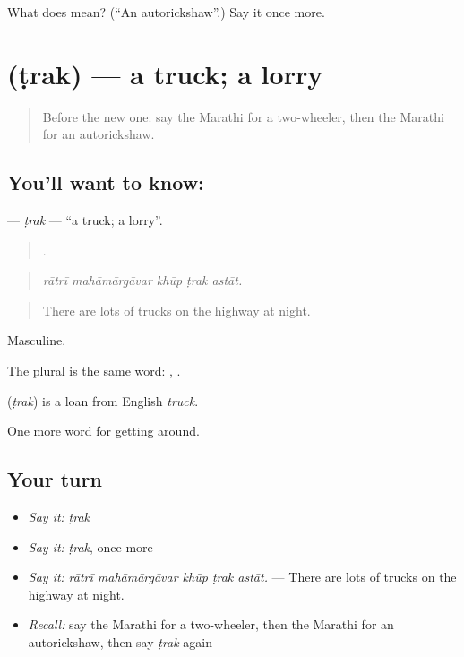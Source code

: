 \begin{tcolorbox}[breakable,colback=teal!4,colframe=teal!35!black,title={Before you move on}]
What does  mean? (\textquotedblleft{}An autorickshaw\textquotedblright{}.) Say it once more.
\end{tcolorbox}
\section[\texorpdfstring{\mr{ट्रक} (ṭrak)}{ट्रक (ṭrak)}]{ (ṭrak) — a truck; a lorry}

\label{lesson:MR-C400-trak}



\begin{quote}
Before the new one: say the Marathi for a two-wheeler, then the Marathi for an autorickshaw.
\end{quote}

\subsection*{You'll want to know: }
\textbf{} — \emph{ṭrak} — \textquotedblleft{}a truck; a lorry\textquotedblright{}.

\begin{quote}
    .
\end{quote}

\begin{quote}
\emph{rātrī mahāmārgāvar khūp ṭrak astāt.}
\end{quote}

\begin{quote}
There are lots of trucks on the highway at night.
\end{quote}

Masculine.

The plural is the same word:  ,  .

\begin{cousinweb}
\textbf{} (\emph{ṭrak}) is a loan from English \emph{truck}.
\end{cousinweb}

\begin{grammarlens}[title={What you've built}]
One more word for getting around.
\end{grammarlens}

\subsection*{Your turn}
\begin{itemize}
\raggedright
  \item \emph{Say it:} \emph{ṭrak}
  \item \emph{Say it:} \emph{ṭrak}, once more
  \item \emph{Say it:} \emph{rātrī mahāmārgāvar khūp ṭrak astāt.} — There are lots of trucks on the highway at night.
  \item \emph{Recall:} say the Marathi for a two-wheeler, then the Marathi for an autorickshaw, then say \emph{ṭrak} again
\end{itemize}

